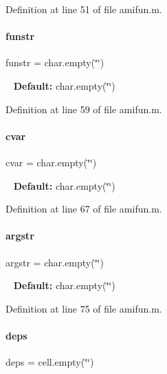 Definition at line 51 of file amifun.\+m.

\mbox{\label{classamifun_a484b54379bc8b29b6ce65d84966ea4c4}} 
\paragraph{\texorpdfstring{funstr}{funstr}}
{\footnotesize\ttfamily funstr = char.\+empty(\char`\"{}\char`\"{})}

~\newline
{\bfseries{Default\+:}} char.\+empty(\char`\"{}\char`\"{}) 

Definition at line 59 of file amifun.\+m.

\mbox{\label{classamifun_a716c1ceb8235bc1005b606f777530ede}} 
\paragraph{\texorpdfstring{cvar}{cvar}}
{\footnotesize\ttfamily cvar = char.\+empty(\char`\"{}\char`\"{})}

~\newline
{\bfseries{Default\+:}} char.\+empty(\char`\"{}\char`\"{}) 

Definition at line 67 of file amifun.\+m.

\mbox{\label{classamifun_aa3914760f4131288b95f0f23d0fdfa6d}} 
\paragraph{\texorpdfstring{argstr}{argstr}}
{\footnotesize\ttfamily argstr = char.\+empty(\char`\"{}\char`\"{})}

~\newline
{\bfseries{Default\+:}} char.\+empty(\char`\"{}\char`\"{}) 

Definition at line 75 of file amifun.\+m.

\mbox{\label{classamifun_a69ffe5c24686ceb79ed44399e6be556c}} 
\paragraph{\texorpdfstring{deps}{deps}}
{\footnotesize\ttfamily deps = cell.\+empty(\char`\"{}\char`\"{})}

